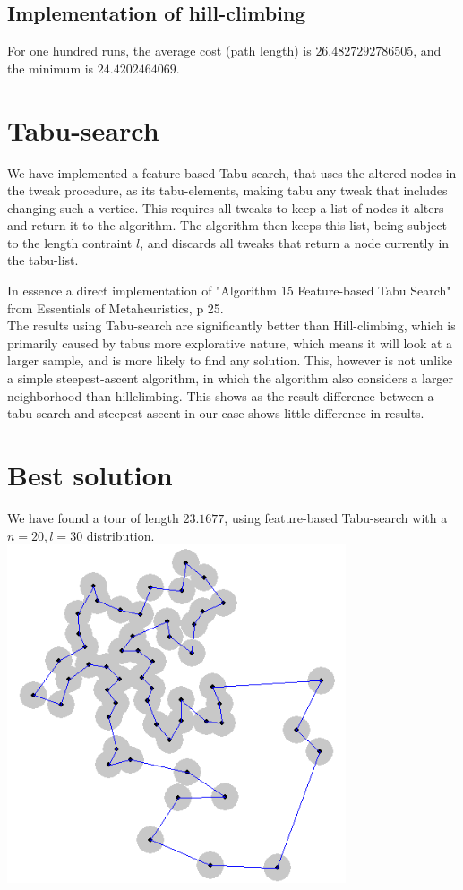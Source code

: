 \documentclass{article}
\begin{document}
\subsection{Implementation of hill-climbing}

For one hundred runs, the average cost (path length) is
$26.4827292786505$, and the minimum is $24.4202464069$.

\section{Tabu-search}
We have implemented a feature-based Tabu-search, that uses the altered nodes in the tweak procedure,
as its tabu-elements, making tabu any tweak that includes changing such a vertice.
This requires all tweaks to keep a list of nodes it alters and return it to the algorithm.
The algorithm then keeps this list, being subject to the length contraint $l$, and discards all tweaks that return
a node currently in the tabu-list.

In essence a direct implementation of "Algorithm 15 Feature-based Tabu Search" from Essentials of Metaheuristics, p 25.\\

The results using Tabu-search are significantly better than Hill-climbing, which is primarily caused by
tabus more explorative nature, which means it will look at a larger sample, and is more likely to find
any solution. This, however is not unlike a simple steepest-ascent algorithm, in which the algorithm
also considers a larger neighborhood than hillclimbing. This shows as the result-difference between a
tabu-search and steepest-ascent in our case shows little difference in results.


\section{Best solution}
We have found a tour of length $23.1677$, using feature-based Tabu-search with a $n=20,l=30$ distribution.\\
\includegraphics[width=100mm]{solution-2316.png}
\end{document}
